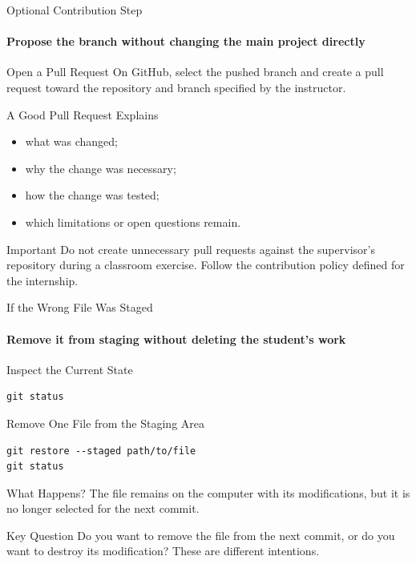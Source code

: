\begin{frame}{Optional Contribution Step}
\framesubtitle{Propose the branch without changing the main project directly}

\footnotesize

\begin{block}{Open a Pull Request}
On GitHub, select the pushed branch and create a pull request toward the
repository and branch specified by the instructor.
\end{block}

\begin{exampleblock}{A Good Pull Request Explains}
\begin{itemize}
    \setlength{\itemsep}{0.20em}
    \item what was changed;
    \item why the change was necessary;
    \item how the change was tested;
    \item which limitations or open questions remain.
\end{itemize}
\end{exampleblock}

\begin{alertblock}{Important}
Do not create unnecessary pull requests against the supervisor's
repository during a classroom exercise. Follow the contribution policy
defined for the internship.
\end{alertblock}

\end{frame}

\begin{frame}[fragile]{If the Wrong File Was Staged}
\framesubtitle{Remove it from staging without deleting the student's work}

\footnotesize

\begin{block}{Inspect the Current State}
\begin{verbatim}
git status
\end{verbatim}
\end{block}

\begin{exampleblock}{Remove One File from the Staging Area}
\begin{verbatim}
git restore --staged path/to/file
git status
\end{verbatim}
\end{exampleblock}

\begin{block}{What Happens?}
The file remains on the computer with its modifications, but it is no
longer selected for the next commit.
\end{block}

\begin{alertblock}{Key Question}
Do you want to remove the file from the next commit, or do you want to
destroy its modification? These are different intentions.
\end{alertblock}

\end{frame}


